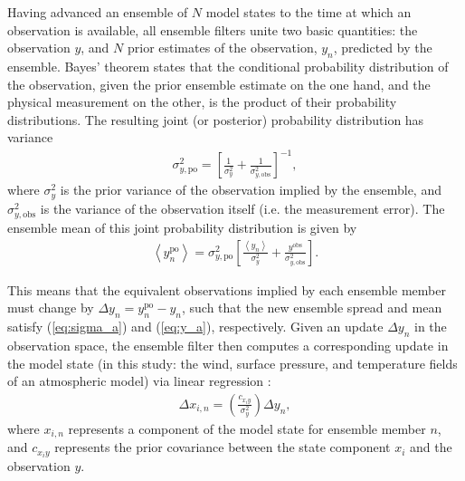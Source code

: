 Having advanced an ensemble of $N$ model states to the time at which an observation is available, 
all ensemble filters unite two basic quantities: the observation $y$, and $N$ prior estimates of the observation, $y_n$, predicted by the ensemble. 
Bayes' theorem states that the conditional probability distribution of the observation, given the prior ensemble estimate on the one hand, and the physical measurement on the other, is the product of their probability distributions.
The resulting joint (or posterior) probability distribution has variance 
\begin{eqnarray}
	\sigma_{y,{\text{po}}}^2 = 
\left[
	\frac{1}{\sigma_y^2}
	+
	\frac{1}{\sigma_{y,\text{obs}}^2}
\right]^{-1},
\label{eq:sigma_a}
\end{eqnarray}
where $\sigma_y^2$ is  the prior variance of the observation implied by the ensemble, 
and $\sigma_{y,\text{obs}}^2$ is the variance of the observation itself (i.e. the measurement error).
The ensemble mean of this joint probability distribution is given by
\begin{eqnarray}
	\left< y^{\text{po}}_n \right> = \sigma_{y,\text{po}}^2 
	\left[
		\frac{\left< y_n \right>}{\sigma_y^2} +
		\frac{y^{\text{obs}}}{\sigma_{y,\text{obs}}^2} 
	\right].
\label{eq:y_a}
\end{eqnarray}

This means that the equivalent observations implied by each ensemble member must change by $\Delta y_n =  y^{\text{po}}_n - y_n$, such that the new ensemble spread and mean satisfy (\ref{eq:sigma_a}) and (\ref{eq:y_a}), respectively.
Given an update $\Delta y_n$ in the observation space, the ensemble filter then computes a corresponding update in the model state (in this study: the wind, surface pressure, and temperature fields of an atmospheric model) via linear regression \citep{Anderson2003}:
\begin{eqnarray}
 \Delta x_{i,n} = 
\left(
	\frac{c_{x_iy}}{\sigma_y^2}
\right)
\Delta y_n,
\label{eq:state_update}
\end{eqnarray}
where $x_{i,n}$ represents a component of the model state for ensemble member $n$, and $c_{x_iy}$ represents the prior covariance between the state component $x_i$ and the observation $y$.

